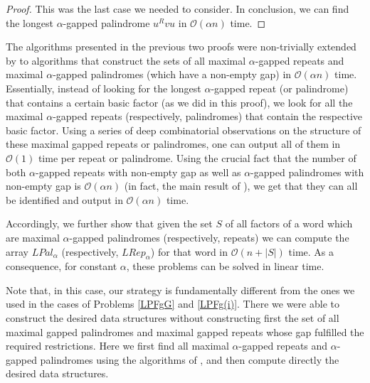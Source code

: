 \documentclass[final]{dmtcs-episciences}
\newcommand{\bigo}{{\mathcal O}}
\newcommand{\LP}{{\mathit{LPal}}_\alpha}
\newcommand{\LR}{{\mathit{LRep}}_\alpha}
\begin{document}
\begin{proof}
This was the last case we needed to consider. In conclusion, we can find the longest $\alpha$-gapped palindrome $u^Rvu$ in $\bigo(\alpha n)$ time.
\end{proof}

The algorithms presented in the previous two proofs were non-trivially extended by \cite{STACS2016} to algorithms that construct the sets of all maximal $\alpha$-gapped repeats and maximal $\alpha$-gapped palindromes (which have a non-empty gap) in $\bigo(\alpha n)$ time. Essentially, instead of looking for the longest $\alpha$-gapped repeat (or palindrome) that contains a certain basic factor (as we did in this proof), we look for all the maximal $\alpha$-gapped repeats (respectively, palindromes) that contain the respective basic factor. Using a series of deep combinatorial observations on the structure of these maximal gapped repeats or palindromes, one can output all of them in $\bigo(1)$ time per repeat or palindrome. Using the crucial fact that the number of both $\alpha$-gapped repeats with non-empty gap as well as $\alpha$-gapped palindromes with non-empty gap is $\bigo(\alpha n)$ (in fact, the main result of \cite{STACS2016}), we get that they can all be identified and output in $\bigo(\alpha n)$ time.

Accordingly, we further show that given the set $S$ of all factors of a word which are maximal $\alpha$-gapped palindromes (respectively, repeats) we can compute the array $\LP$ (respectively, $\LR$) for that word in $\bigo(n+|S|)$ time. As a consequence, for constant $\alpha$, these problems can be solved in linear time. 

Note that, in this case, our strategy is fundamentally different from the ones we used in the cases of Problems \ref{LPFgG} and \ref{LPFg(i)}. There we were able to construct the desired data structures without constructing first the set of all maximal gapped palindromes and maximal gapped repeats whose gap fulfilled the required restrictions. Here we first find all maximal $\alpha$-gapped repeats and $\alpha$-gapped palindromes using the algorithms of \cite{STACS2016}, and then compute directly the desired data structures. 
\end{document}
